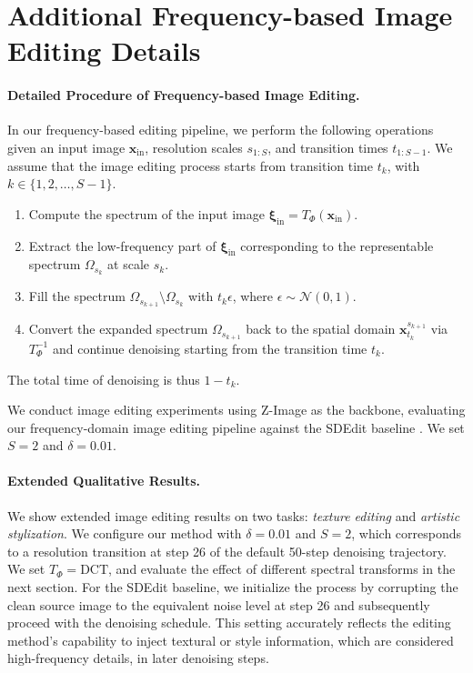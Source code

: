 \section{Additional Frequency-based Image Editing Details}
\label{sec:image_editing}

\paragraph{Detailed Procedure of Frequency-based Image Editing.} In our frequency-based editing pipeline, we perform the following operations given an input image $\mathbf{x}_\text{in}$, resolution scales $s_{1:S}$, and transition times $t_{1:S-1}$. We assume that the image editing process starts from transition time $t_k$, with $k \in \{1, 2, \ldots, S-1\}$.

\begin{enumerate}
    \item Compute the spectrum of the input image $\boldsymbol{\xi}_\text{in} = T_\Phi(\mathbf{x}_\text{in})$.
    \item Extract the low-frequency part of $\boldsymbol{\xi}_\text{in}$ corresponding to the representable spectrum $\Omega_{s_k}$ at scale $s_k$. 
    \item Fill the spectrum $\Omega_{s_{k+1}} \setminus \Omega_{s_k}$ with $t_k\epsilon$, where $\epsilon \sim \mathcal{N}(0, 1)$.
    \item Convert the expanded spectrum $\Omega_{s_{k+1}}$ back to the spatial domain $\mathbf{x}_{t_k}^{s_{k+1}}$ via $T^{-1}_\Phi$ and continue denoising starting from the transition time $t_k$.
\end{enumerate}

The total time of denoising is thus $1-t_k$.

We conduct image editing experiments using Z-Image \citep{zimage} as the backbone, evaluating our frequency-domain image editing pipeline against the SDEdit baseline \citep{meng2022sdedit}. We set $S=2$ and  $\delta=0.01$.

\paragraph{Extended Qualitative Results.} We show extended image editing results on two tasks: \textit{texture editing} and \textit{artistic stylization}. We configure our method with $\delta=0.01$ and $S=2$, which corresponds to a resolution transition at step 26 of the default 50-step denoising trajectory. We set $T_\Phi=\text{DCT}$, and evaluate the effect of different spectral transforms in the next section. For the SDEdit baseline, we initialize the process by corrupting the clean source image to the equivalent noise level at step 26 and subsequently proceed with the denoising schedule. This setting accurately reflects the editing method's capability to inject textural or style information, which are considered high-frequency details, in later denoising steps. 

